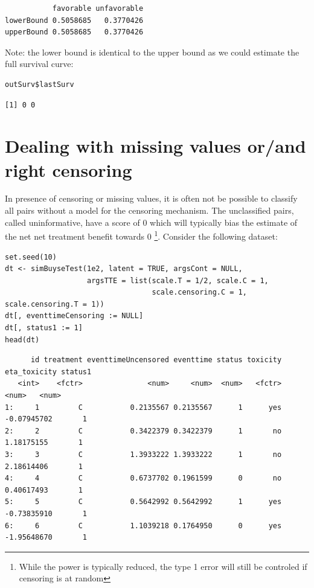 \documentclass[12pt]{article}
\begin{document}
\begin{verbatim}
           favorable unfavorable
lowerBound 0.5058685   0.3770426
upperBound 0.5058685   0.3770426
\end{verbatim}


Note: the lower bound is identical to the upper bound as we could
estimate the full survival curve:
\lstset{language=r,label= ,caption= ,captionpos=b,numbers=none}
\begin{lstlisting}
outSurv$lastSurv
\end{lstlisting}

\begin{verbatim}
[1] 0 0
\end{verbatim}


\clearpage

\section{Dealing with missing values or/and right censoring}
\label{sec:org801fb8a}

In presence of censoring or missing values, it is often not be
 possible to classify all pairs without a model for the censoring
 mechanism. The unclassified pairs, called uninformative, have a score
 of 0 which will typically bias the estimate of the net net treatment benefit
 towards 0 \footnote{While the power is typically reduced, the type 1 error
 will still be controled if censoring is at random}. Consider the
 following dataset:
\lstset{language=r,label= ,caption= ,captionpos=b,numbers=none}
\begin{lstlisting}
set.seed(10)
dt <- simBuyseTest(1e2, latent = TRUE, argsCont = NULL,
                   argsTTE = list(scale.T = 1/2, scale.C = 1,
                                  scale.censoring.C = 1, scale.censoring.T = 1))
dt[, eventtimeCensoring := NULL]
dt[, status1 := 1]
head(dt)
\end{lstlisting}

\begin{verbatim}
      id treatment eventtimeUncensored eventtime status toxicity eta_toxicity status1
   <int>    <fctr>               <num>     <num>  <num>   <fctr>        <num>   <num>
1:     1         C           0.2135567 0.2135567      1      yes  -0.07945702       1
2:     2         C           0.3422379 0.3422379      1       no   1.18175155       1
3:     3         C           1.3933222 1.3933222      1       no   2.18614406       1
4:     4         C           0.6737702 0.1961599      0       no   0.40617493       1
5:     5         C           0.5642992 0.5642992      1      yes  -0.73835910       1
6:     6         C           1.1039218 0.1764950      0      yes  -1.95648670       1
\end{verbatim}
\end{document}
